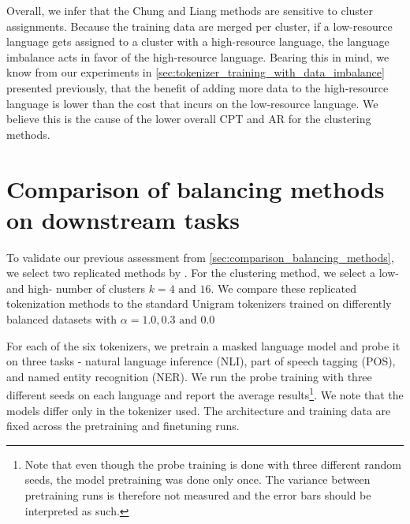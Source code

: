 Overall, we infer that the Chung and Liang methods are sensitive to cluster assignments. Because the training data are merged per cluster, if a low-resource language gets assigned to a cluster with a high-resource language, the language imbalance acts in favor of the high-resource language. Bearing this in mind, we know from our experiments in \autoref{sec:tokenizer_training_with_data_imbalance} presented previously, that the benefit of adding more data to the high-resource language is lower than the cost that incurs on the low-resource language. We believe this is the cause of the lower overall CPT and AR for the clustering methods.


\section{Comparison of balancing methods on downstream tasks}

To validate our previous assessment from \autoref{sec:comparison_balancing_methods}, we select two replicated methods by \citet{chung_improving_2020,zheng_allocating_2021}. For the clustering method, we select a low- and high- number of clusters $k=4\text{ and }16$. We compare these replicated tokenization methods to the standard Unigram tokenizers trained on differently balanced datasets with $\alpha=1.0, 0.3\text{ and }0.0$

For each of the six tokenizers, we pretrain a masked language model and probe it on three tasks - natural language inference (NLI), part of speech tagging (POS), and named entity recognition (NER). We run the probe training with three different seeds on each language and report the average results\footnote{Note that even though the probe training is done with three different random seeds, the model pretraining was done only once. The variance between pretraining runs is therefore not measured and the error bars should be interpreted as such.}. We note that the models differ only in the tokenizer used. The architecture and training data are fixed across the pretraining and finetuning runs.


